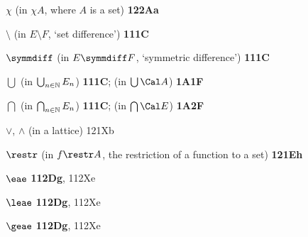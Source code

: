 \indexmedskip
\indexheader{$\scriptstyle\pmb{\chi}$}

$\chi$ (in $\chi A$, where $A$ is a set) {\bf 122Aa}






\indexheader{$\scriptstyle\pmb{\omega}$}


































\indexmedskip
{}

$\setminus$ (in $E\setminus F$, `set difference') {\bf 111C}

$\symmdiff$ (in $E\symmdiff F$, `symmetric difference') {\bf 111C}







$\bigcup$ (in $\bigcup_{n\in\Bbb N}E_n$) {\bf 111C};
  (in $\bigcup\Cal A$) {\bf 1A1F}

$\bigcap$ (in $\bigcap_{n\in\Bbb N}E_n$) {\bf 111C};
  (in $\bigcap\Cal E$) {\bf 1A2F}

$\vee$, $\wedge$ (in a lattice) 121Xb





$\restr$ (in $f\restr A$, the restriction of a function to a set) {\bf
121Eh}





$\eae$ {\bf 112Dg}, 112Xe

$\leae$ {\bf 112Dg}, 112Xe

$\geae$ {\bf 112Dg}, 112Xe






























